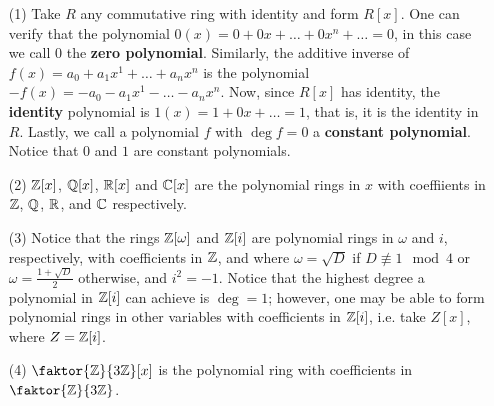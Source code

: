 \begin{example}\label{1.6}
    \begin{enumerate}
        \item[(1)] Take $R$ any commutative ring with identity and form $R[x]$.
            One can verify that the polynomial $0(x)=0+0x+\dots+0x^n+\dots=0$,
            in this case we call $0$ the \textbf{zero polynomial}. Similarly,
            the additive inverse of $f(x)=a_0+a_1x^1+\dots+a_nx^n$ is the
            polynomial $-f(x)=-a_0-a_1x^1-\dots-a_nx^n$. Now, since $R[x]$ has
            identity, the \textbf{identity} polynomial is $1(x)=1+0x+\dots=1$,
            that is, it is the identity in $R$. Lastly, we call a polynomial $f$
            with  $\deg{f}=0$ a \textbf{constant polynomial}. Notice that $0$
            and  $1$ are constant polynomials.

        \item[(2)] $\mathbb{Z}[x]$, $\mathbb{Q}[x]$, $\mathbb{R}[x]$ and $\mathbb{C}[x]$ are the polynomial
            rings in $x$ with coeffiients in $\mathbb{Z}$, $\mathbb{Q}$, $\mathbb{R}$, and $\mathbb{C}$
            respectively.

        \item[(3)] Notice that the rings $\mathbb{Z}[\omega]$ and $\mathbb{Z}[i]$ are polynomial
            rings in $\omega$ and  $i$, respectively, with coefficients in $\mathbb{Z}$,
            and where $\omega=\sqrt{D}$ if $D \not\equiv 1 \mod{4}$ or
            $\omega=\frac{1+\sqrt{D}}{2}$ otherwise, and $i^2=-1$. Notice that
            the highest degree a polynomial in  $\mathbb{Z}[i]$ can achieve is $\deg=1$;
            however, one may be able to form polynomial rings in other variables
            with coefficients in $\mathbb{Z}[i]$, i.e. take $Z[x]$, where $Z=\mathbb{Z}[i]$.

        \item[(4)] $\faktor{\Z}{3\Z}[x]$ is the polynomial ring with
            coefficients in $\faktor{\Z}{3\Z}$.
    \end{enumerate}
\end{example}

